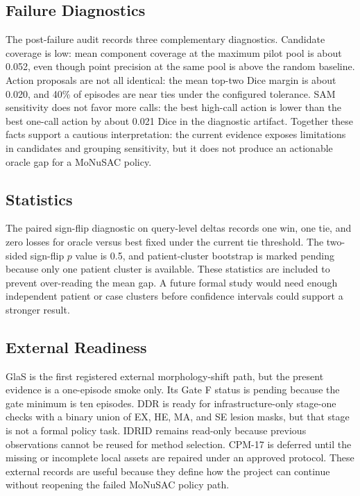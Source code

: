 \subsection{Failure Diagnostics}
The post-failure audit records three complementary diagnostics. Candidate coverage is low: mean component coverage at the maximum pilot pool is about 0.052, even though point precision at the same pool is above the random baseline. Action proposals are not all identical: the mean top-two Dice margin is about 0.020, and 40\% of episodes are near ties under the configured tolerance. SAM sensitivity does not favor more calls: the best high-call action is lower than the best one-call action by about 0.021 Dice in the diagnostic artifact. Together these facts support a cautious interpretation: the current evidence exposes limitations in candidates and grouping sensitivity, but it does not produce an actionable oracle gap for a MoNuSAC policy.

\subsection{Statistics}
The paired sign-flip diagnostic on query-level deltas records one win, one tie, and zero losses for oracle versus best fixed under the current tie threshold. The two-sided sign-flip $p$ value is 0.5, and patient-cluster bootstrap is marked pending because only one patient cluster is available. These statistics are included to prevent over-reading the mean gap. A future formal study would need enough independent patient or case clusters before confidence intervals could support a stronger result.

\subsection{External Readiness}
GlaS is the first registered external morphology-shift path, but the present evidence is a one-episode smoke only. Its Gate F status is pending because the gate minimum is ten episodes. DDR is ready for infrastructure-only stage-one checks with a binary union of EX, HE, MA, and SE lesion masks, but that stage is not a formal policy task. IDRID remains read-only because previous observations cannot be reused for method selection. CPM-17 is deferred until the missing or incomplete local assets are repaired under an approved protocol. These external records are useful because they define how the project can continue without reopening the failed MoNuSAC policy path.
